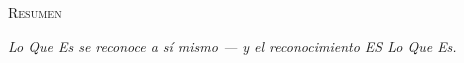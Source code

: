 \documentclass[10pt, openany, oneside]{book}
\renewcommand{\huge}{\fontsize{17}{21}\selectfont}
\begin{document}
\newpage


\thispagestyle{empty}
\vspace*{0.5in}

\begin{center}
    {\huge\scshape Resumen}
\end{center}

\vspace{1em}

\begin{center}
\begin{minipage}{0.85\textwidth}
\centering
{\fontsize{9}{12}\selectfont

\begin{center}
\textit{Lo Que Es se reconoce a sí mismo --- y el reconocimiento ES Lo Que Es.}
\end{center}

\vspace{0.5em}

}
\end{minipage}
\end{center}
\end{document}
